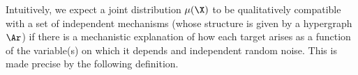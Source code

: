 
Intuitively, we expect a joint distribution $\mu(\X)$ to be 
qualitatively
compatible with a {s}et of {i}ndependent {m}echanisms
%
(whose structure is given by a hypergraph $\Ar$)
if 
there is
a mechanistic explanation of how each target
arises as a function of the variable(s) on which it depends
and independent random noise.
This is made precise by the following definition.


